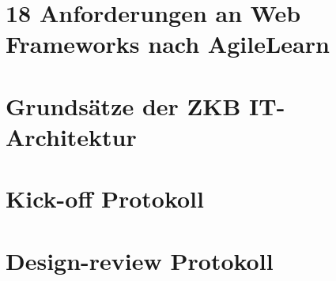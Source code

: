 \documentclass[
11pt, %
a4paper, %
BCOR25mm, %
DIV14, %
footsepline = false, %
headsepline, %
twoside, %
openright,
abstracton, %
listof=totocnumbered, %
bibliography=totocnumbered %
]{scrreprt}
\begin{document}
  \chapter{18 Anforderungen an Web Frameworks nach
  AgileLearn}\label{chapter:18AnforderungenNachAgileLearn}
 
  

  \cleardoublepage
   
    
  \chapter{Grundsätze der ZKB
  IT-Architektur}\label{chapter:GrundsaetzeDerZkbItArchitektur}
 
  

  \cleardoublepage

 
 
  \chapter{Kick-off Protokoll}\label{chapter:KickOffProtokoll}

  
  
  \cleardoublepage
  
   
  \chapter{Design-review Protokoll}\label{chapter:DesignReviewProtokoll}
  
\end{document}
